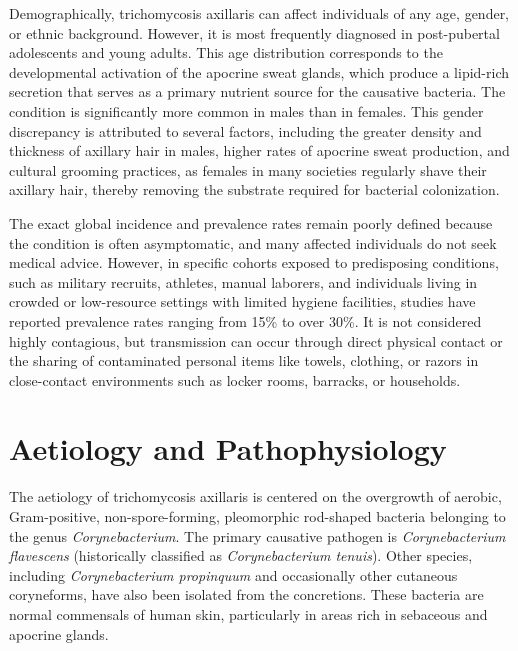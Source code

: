 Demographically, trichomycosis axillaris can affect individuals of any age, gender, or ethnic background. However, it is most frequently diagnosed in post-pubertal adolescents and young adults. This age distribution corresponds to the developmental activation of the apocrine sweat glands, which produce a lipid-rich secretion that serves as a primary nutrient source for the causative bacteria. The condition is significantly more common in males than in females. This gender discrepancy is attributed to several factors, including the greater density and thickness of axillary hair in males, higher rates of apocrine sweat production, and cultural grooming practices, as females in many societies regularly shave their axillary hair, thereby removing the substrate required for bacterial colonization.

The exact global incidence and prevalence rates remain poorly defined because the condition is often asymptomatic, and many affected individuals do not seek medical advice. However, in specific cohorts exposed to predisposing conditions, such as military recruits, athletes, manual laborers, and individuals living in crowded or low-resource settings with limited hygiene facilities, studies have reported prevalence rates ranging from 15\% to over 30\%. It is not considered highly contagious, but transmission can occur through direct physical contact or the sharing of contaminated personal items like towels, clothing, or razors in close-contact environments such as locker rooms, barracks, or households.

\section*{Aetiology and Pathophysiology}
The aetiology of trichomycosis axillaris is centered on the overgrowth of aerobic, Gram-positive, non-spore-forming, pleomorphic rod-shaped bacteria belonging to the genus \textit{Corynebacterium}. The primary causative pathogen is \textit{Corynebacterium flavescens} (historically classified as \textit{Corynebacterium tenuis}). Other species, including \textit{Corynebacterium propinquum} and occasionally other cutaneous coryneforms, have also been isolated from the concretions. These bacteria are normal commensals of human skin, particularly in areas rich in sebaceous and apocrine glands.

